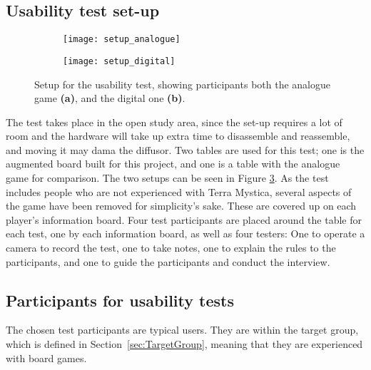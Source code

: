 \subsection{Usability test set-up}
\begin{figure}
	\centering
	\begin{subfigure}[b]{0.4\textwidth}
	\texttt{[image: setup\_analogue]}
		\caption{\label{Fig:SetupAna}}
	\end{subfigure}
	\begin{subfigure}[b]{0.4\textwidth}
	\texttt{[image: setup\_digital]}
		\caption{\label{Fig:SetupDigi}}
	\end{subfigure}
	\caption{Setup for the usability test, showing participants both the analogue game \textbf{(a)}, and the digital one \textbf{(b)}.\label{Fig:Setup}}
\end{figure}
The test takes place in the open study area, since the set-up requires a lot of room and the hardware will take up extra time to disassemble and reassemble, and moving it may dama the diffusor. Two tables are used for this test; one is the augmented board built for this project, and one is a table with the analogue game for comparison. The two setups can be seen in Figure \ref{Fig:Setup}. As the test includes people who are not experienced with Terra Mystica, several aspects of the game have been removed for simplicity's sake. These are covered up on each player's information board. Four test participants are placed around the table for each test, one by each information board, as well as four testers: One to operate a camera to record the test, one to take notes, one to explain the rules to the participants, and one to guide the participants and conduct the interview.

\subsection{Participants for usability tests}
The chosen test participants are typical users. They are within the target group, which is defined in Section~\ref{sec:TargetGroup}, meaning that they are experienced with board games. 

